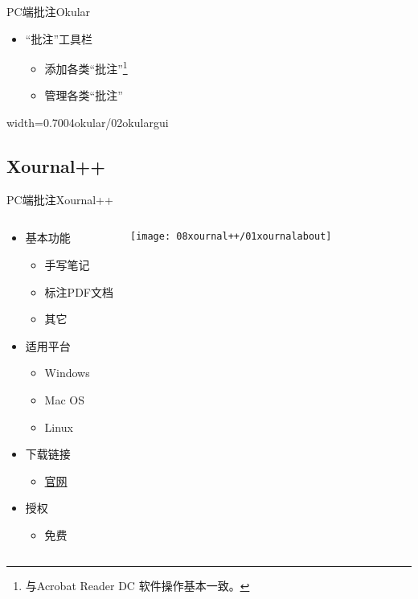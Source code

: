 \documentclass[fontset = none, t, aspectratio=169]{ctexbeamer}
\begin{document}
\begin{frame}{PC端批注}{Okular}
  \begin{itemize}
  \item \enquote{批注}工具栏
    \begin{itemize}
    \item 添加各类\enquote{批注}\footnote[frame,1]{与Acrobat Reader DC
        软件操作基本一致。}
    \item 管理各类\enquote{批注}
    \end{itemize}
  \end{itemize}
  \begin{center}
    \begin{annotationimage}{width=0.70\textwidth}{04okular/02okulargui}
    \end{annotationimage}
  \end{center}
\end{frame}

\subsection{Xournal++}

\begin{frame}{PC端批注}{Xournal++}
  \begin{columns}[c,onlytextwidth]
    \begin{spacing}{1.3}
    \begin{itemize}
    \item 基本功能
      \begin{itemize}
      \item 手写笔记
      \item \alert{标注}PDF文档
      \item 其它
      \end{itemize}
    \item 适用平台
      \begin{itemize}
      \item Windows
      \item Mac OS
      \item Linux
      \end{itemize}
    \item 下载链接
      \begin{itemize}
        \item \href{https://xournalpp.github.io/}{官网}
      \end{itemize}
    \item 授权
      \begin{itemize}
      \item \alert{免费}
      \end{itemize}
    \end{itemize}
    \end{spacing}
    \vspace{1ex}
    \texttt{[image: 08xournal++/01xournalabout]}
  \end{columns}
\end{frame}
\end{document}
